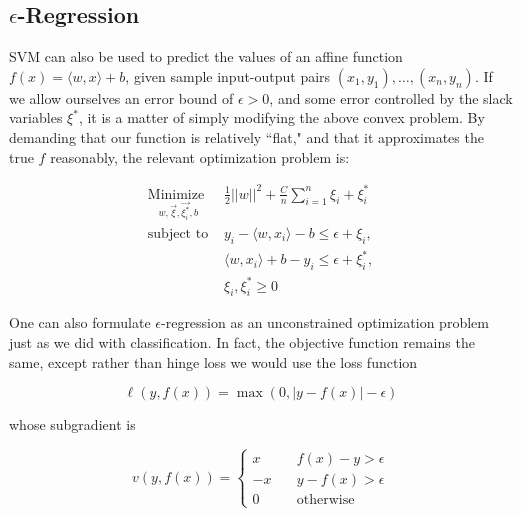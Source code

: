 \subsection{$\epsilon$-Regression}

SVM can also be used to predict the values of an affine function $f(x) = \langle w, x\rangle+b$, given sample input-output pairs $(x_1,y_1),\ldots,(x_n,y_n)$. If we allow ourselves an error bound of $\epsilon>0$, and some error controlled by the slack variables $\xi^*$, it is a matter of simply modifying the above convex problem. By demanding that our function is relatively ``flat," and that it approximates the true $f$ reasonably, the relevant optimization problem is:

\begin{align*}
\underset{w,\vec{\xi},\vec{\xi^*_i},b}{\text{Minimize }} & \frac{1}{2}||w||^2 + \frac{C}{n}\sum_{i=1}^n \xi_i + \xi^*_i \\
\text{subject to } & y_i - \langle w, x_i\rangle - b \leq \epsilon + \xi_i,\\
						&  \langle w, x_i\rangle + b - y_i \leq \epsilon + \xi^*_i, \\
						& \xi_i,\xi^*_i \geq 0
\end{align*}

One can also formulate $\epsilon$-regression as an unconstrained optimization problem just as we did with classification. In fact, the objective function remains the same, except rather than hinge loss we would  use the loss function

\[ \ell(y,f(x)) = \max(0,|y-f(x)|-\epsilon) \]

whose subgradient is

$$
v(y,f(x)) = \left\{
        \begin{array}{ll}
            x & \quad f(x) - y > \epsilon \\
            -x  & \quad  y - f(x)  > \epsilon \\
            0 & \quad \text{otherwise}
        \end{array}
    \right.
$$






%












